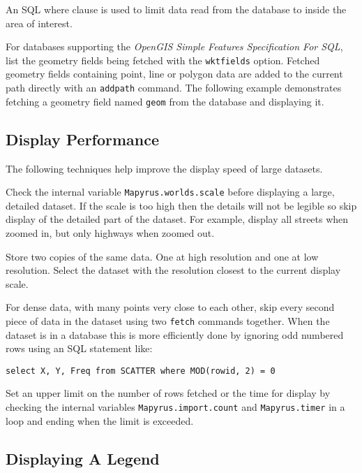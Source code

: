 An SQL where clause is used to limit data read from
the database to inside the area of interest.



For databases supporting the \textit{OpenGIS Simple Features Specification For
SQL}, list the geometry fields being fetched with the \texttt{wktfields}
option.  Fetched geometry fields containing point, line or polygon data are
added to the current path directly with an \texttt{addpath} command.  The
following example demonstrates fetching a geometry field named \texttt{geom}
from the database and displaying it.



\subsection{Display Performance}

The following techniques help improve the display speed of large datasets.

Check the internal variable \texttt{Mapyrus.worlds.scale} before displaying a
large, detailed dataset.  If the scale is too high then the details will not be
legible so skip display of the detailed part of the dataset.  For example,
display all streets when zoomed in, but only highways when zoomed out.

Store two copies of the same data.  One at high resolution and one at low
resolution.  Select the dataset with the resolution closest to the current
display scale.

For dense data, with many points very close to each other, skip every second
piece of data in the dataset using two \texttt{fetch} commands together.  When
the dataset is in a database this is more efficiently done by ignoring odd
numbered rows using an SQL statement like:

\begin{verbatim}
select X, Y, Freq from SCATTER where MOD(rowid, 2) = 0
\end{verbatim}

Set an upper limit on the number of rows fetched or the time for display by
checking the internal variables \texttt{Mapyrus.import.count} and
\texttt{Mapyrus.timer} in a loop and ending when the limit is exceeded.

\subsection{Displaying A Legend}

